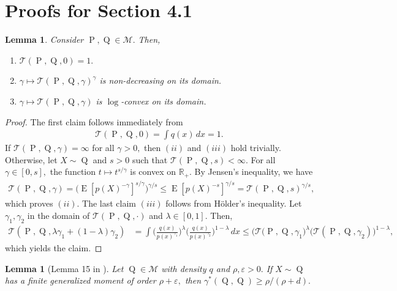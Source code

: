 \documentclass[10pt]{article}
\newcommand{\eps}{\varepsilon}
\newcommand{\mM}{\mathcal{M}}
\newcommand{\mT}{\mathcal{T}}
\newcommand{\RR}{\mathbb{R}}
\newcommand{\E}{\operatorname{E}}
\renewcommand{\P}{\operatorname{P}}
\newcommand{\Q}{\operatorname{Q}}
\newtheorem{lemma}[theorem]{Lemma}
\begin{document}
\section{Proofs for Section 4.1}
\label{app.4.1}



\begin{lemma}\label{lem.ratio.bound}
    Consider $\P, \Q \in \mM.$ Then, 
    \begin{enumerate}
        \item [$(i)$] $\mT(\P, \Q, 0) = 1.$
        \item [$(ii)$] $\gamma \mapsto \mT(\P, \Q, \gamma)^\gamma$ is non-decreasing on its domain.
        \item [$(iii)$] $\gamma \mapsto \mT(\P, \Q, \gamma)$ is $\log$-convex on its domain.
    \end{enumerate}
\end{lemma}
\begin{proof}
    The first claim follows immediately from
    \begin{align*}
        \mT(\P, \Q, 0) = \int q(x)\, dx = 1.
    \end{align*}
    If $\mT(\P, \Q, \gamma) = \infty$ for all $\gamma > 0,$ then $(ii)$ and $(iii)$ hold trivially. Otherwise, let $X \sim \Q$ and $s > 0$ such that $\mT(\P, \Q, s) < \infty.$ For all $\gamma \in [0, s],$ the function $t \mapsto t^{s/\gamma}$ is convex on $\RR_+.$ By Jensen's inequality, we have 
    \begin{align*}
       \mT(\P, \Q, \gamma) = \big(\E[p(X)^{-\gamma}]^{s/\gamma}\big)^{\gamma/s} \leq \E[p(X)^{-s}]^{\gamma/s} = \mT(\P, \Q, s)^{\gamma/s},
    \end{align*}
    which proves $(ii).$ The last claim $(iii)$ follows from H\"older's inequality. Let $\gamma_1, \gamma_2$ in the domain of $\mT(\P, \Q, \cdot)$ and $\lambda \in [0, 1].$ Then,
    \begin{align*}
        \mT(\P, \Q, \lambda \gamma_1 + (1 - \lambda) \gamma_2) &= \int \bigg(\frac{q(x)}{p(x)^{\gamma_1}}\bigg)^{\lambda}\bigg(\frac{q(x)}{p(x)^{\gamma_2}}\bigg)^{1-\lambda}\, dx \leq \big(\mT(\P, \Q, \gamma_1\big)^{\lambda}\big(\mT(\P, \Q, \gamma_2)\big)^{1 - \lambda},
    \end{align*}
    which yields the claim.
\end{proof}


\begin{lemma}[Lemma 15 in \cite{zamolodtchikov2024transfer}]\label{lem.pseudo.moment}
Let $\Q \in \mM$ with density $q$ and $\rho, \eps > 0.$ If $X \sim \Q$ has a finite generalized moment of order $\rho + \eps,$ then $\gamma^*(\Q, \Q) \geq \rho/(\rho+d).$
\end{lemma}
\end{document}
